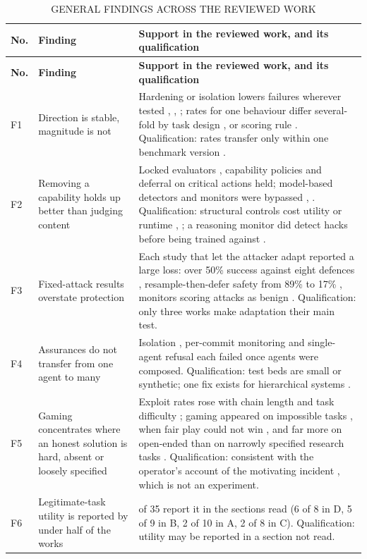 \begingroup
\fontsize{9}{10.5}\selectfont
\setlength{\tabcolsep}{1.4mm}
\renewcommand{\arraystretch}{1.08}
\begin{longtable}{|>{\raggedright\arraybackslash}p{9.66mm}|>{\raggedright\arraybackslash}p{43.47mm}|>{\raggedright\arraybackslash}p{107.87mm}|}
\caption{GENERAL FINDINGS ACROSS THE REVIEWED WORK}\\
\hline
\rowcolor{navy}\color{white}\bfseries No. & \color{white}\bfseries Finding & \color{white}\bfseries Support in the reviewed work, and its qualification\\\hline
\endfirsthead
\hline
\rowcolor{navy}\color{white}\bfseries No. & \color{white}\bfseries Finding & \color{white}\bfseries Support in the reviewed work, and its qualification\\\hline
\endhead
\endfoot
\endlastfoot
F1 & Direction is stable, magnitude is not & Hardening or isolation lowers failures wherever tested \cite{r4}, \cite{r16}, \cite{r23}; rates for one behaviour differ several-fold by task design \cite{r13}, \cite{r3} or scoring rule \cite{r9}. Qualification: rates transfer only within one benchmark version \cite{r19}.\\\hline
F2 & Removing a capability holds up better than judging content & Locked evaluators \cite{r16}, capability policies \cite{r23} and deferral on critical actions \cite{r36} held; model-based detectors and monitors were bypassed \cite{r21}, \cite{r37}. Qualification: structural controls cost utility or runtime \cite{r16}, \cite{r27}; a reasoning monitor did detect hacks before being trained against \cite{r38}.\\\hline
F3 & Fixed-attack results overstate protection & Each study that let the attacker adapt reported a large loss: over 50\% success against eight defences \cite{r21}, resample-then-defer safety from 89\% to 17\% \cite{r36}, monitors scoring attacks as benign \cite{r37}. Qualification: only three works make adaptation their main test.\\\hline
F4 & Assurances do not transfer from one agent to many & Isolation \cite{r27}, per-commit monitoring \cite{r28} and single-agent refusal \cite{r26} each failed once agents were composed. Qualification: test beds are small or synthetic; one fix exists for hierarchical systems \cite{r27}.\\\hline
F5 & Gaming concentrates where an honest solution is hard, absent or loosely specified & Exploit rates rose with chain length and task difficulty \cite{r4}; gaming appeared on impossible tasks \cite{r3}, when fair play could not win \cite{r12}, and far more on open-ended than on narrowly specified research tasks \cite{r15}. Qualification: consistent with the operator's account of the motivating incident \cite{r8}, which is not an experiment.\\\hline
F6 & Legitimate-task utility is reported by under half of the works & 15 of 35 report it in the sections read (6 of 8 in D, 5 of 9 in B, 2 of 10 in A, 2 of 8 in C). Qualification: utility may be reported in a section not read.\\\hline
\end{longtable}
\endgroup

